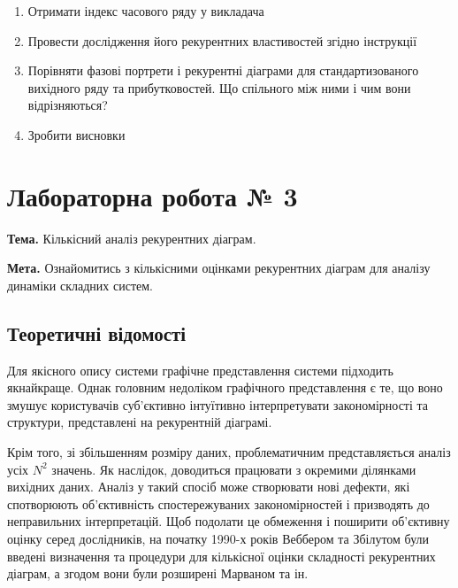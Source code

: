 \documentclass[
  letterpaper,
]{report}
\providecommand{\tightlist}{%
  \setlength{\itemsep}{0pt}\setlength{\parskip}{0pt}}\usepackage{longtable,booktabs,array}
\begin{document}
\begin{enumerate}
\def\labelenumi{\arabic{enumi}.}
\tightlist
\item
  Отримати індекс часового ряду у викладача
\item
  Провести дослідження його рекурентних властивостей згідно інструкції
\item
  Порівняти фазові портрети і рекурентні діаграми для стандартизованого
  вихідного ряду та прибутковостей. Що спільного між ними і чим вони
  відрізняються?
\item
  Зробити висновки
\end{enumerate}


\hypertarget{ux43bux430ux431ux43eux440ux430ux442ux43eux440ux43dux430-ux440ux43eux431ux43eux442ux430-3}{%
\chapter{Лабораторна робота №
3}\label{ux43bux430ux431ux43eux440ux430ux442ux43eux440ux43dux430-ux440ux43eux431ux43eux442ux430-3}}

\textbf{Тема.} Кількісний аналіз рекурентних діаграм.

\textbf{Мета.} Ознайомитись з кількісними оцінками рекурентних діаграм
для аналізу динаміки складних систем.

\hypertarget{ux442ux435ux43eux440ux435ux442ux438ux447ux43dux456-ux432ux456ux434ux43eux43cux43eux441ux442ux456-2}{%
\section{Теоретичні
відомості}\label{ux442ux435ux43eux440ux435ux442ux438ux447ux43dux456-ux432ux456ux434ux43eux43cux43eux441ux442ux456-2}}

Для якісного опису системи графічне представлення системи підходить
якнайкраще. Однак головним недоліком графічного представлення є те, що
воно змушує користувачів суб'єктивно інтуїтивно інтерпретувати
закономірності та структури, представлені на рекурентній діаграмі.

Крім того, зі збільшенням розміру даних, проблематичним представляється
аналіз усіх \(N^2\) значень. Як наслідок, доводиться працювати з
окремими ділянками вихідних даних. Аналіз у такий спосіб може створювати
нові дефекти, які спотворюють об'єктивність спостережуваних
закономірностей і призводять до неправильних інтерпретацій. Щоб подолати
це обмеження і поширити об'єктивну оцінку серед дослідників, на початку
1990-х років Веббером та Збілутом були введені визначення та процедури
для кількісної оцінки складності рекурентних діаграм, а згодом вони були
розширені Марваном та ін.
\end{document}
